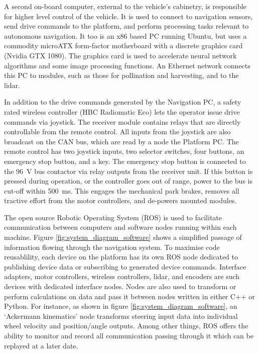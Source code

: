 \documentclass[preprint,authoryear,12pt]{elsarticle}
\begin{document}
        A second on-board computer, external to the vehicle's cabinetry, is responsible for higher level control of the vehicle.
        It is used to connect to navigation sensors, send drive commands to the platform, and perform processing tasks relevant to autonomous navigation.
        It too is an x86 based PC running Ubuntu, but uses a commodity microATX form-factor motherboard with a discrete graphics card (Nvidia GTX 1080).
        The graphics card is used to accelerate neural network algorithms and some image processing functions.
        An Ethernet network connects this PC to modules, such as those for pollination and harvesting, and to the lidar.

        In addition to the drive commands generated by the Navigation PC, a safety rated wireless controller (HBC Radiomatic Eco) lets the operator issue drive commands via joystick.
        The receiver module contains relays that are directly controllable from the remote control.
        All inputs from the joystick are also broadcast on the CAN bus, which are read by a node the Platform PC.
        The remote control has two joystick inputs, two selector switches, four buttons, an emergency stop button, and a key.
        The emergency stop button is connected to the \SI{96}{\volt} bus contactor via relay outputs from the receiver unit.
        If this button is pressed during operation, or the controller goes out of range, power to the bus is cut-off within \SI{500}{\milli\second}.
        This engages the mechanical park brakes, removes all tractive effort from the motor controllers, and de-powers mounted modules.


        The open source Robotic Operating System (ROS) is used to facilitate communication between computers and software nodes running within each machine.
        Figure \ref{fig:system_diagram_software} shows a simplified passage of information flowing through the navigation system.
        To maximise code reusablility, each device on the platform has its own ROS node dedicated to publishing device data or subscribing to generated device commands.
        Interface adapters, motor controllers, wireless controllers, lidar, and encoders are such devices with dedicated interface nodes.
        Nodes are also used to transform or perform calculations on data and pass it between nodes written in either C++ or Python.
        For instance, as shown in figure \ref{fig:system_diagram_software}, an `Ackermann kinematics' node transforms steering input data into individual wheel velocity and position/angle outputs.
        Among other things, ROS offers the ability to monitor and record all communication passing through it which can be replayed at a later date.
\end{document}
